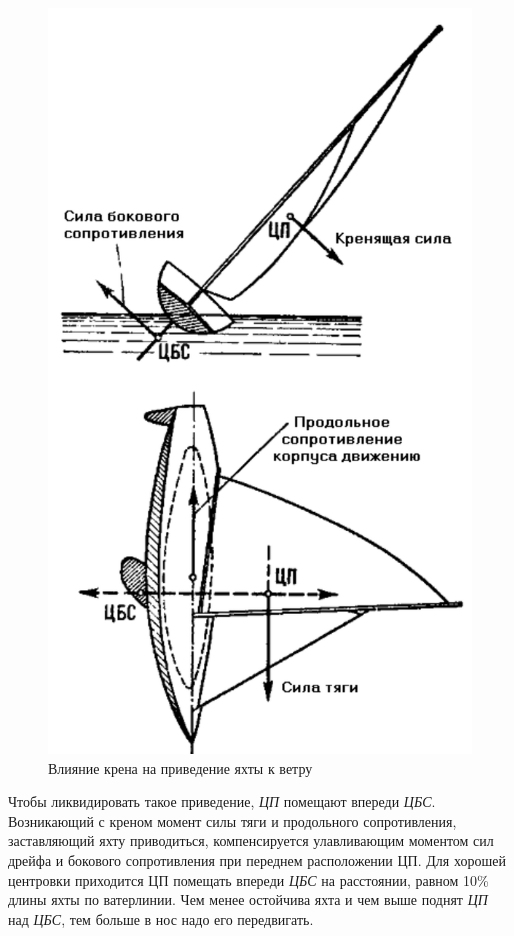 \documentclass[a4paper, 12pt, twoside, final]{scrbook}
\begin{document}
\begin{figure}[htbp]
   \centering
   \includegraphics{100_Vlijanie_krena} %
   \caption{Влияние крена на приведение яхты к ветру}
   \label{fig:100}
\end{figure}

Чтобы ликвидировать такое приведение, \textit{ЦП} помещают впереди \textit{ЦБС}. Возникающий с креном момент силы тяги и продольного сопротивления, заставляющий яхту приводиться, компенсируется улавливающим моментом сил дрейфа и бокового сопротивления при переднем расположении ЦП. Для хорошей центровки приходится ЦП помещать впереди \textit{ЦБС} на расстоянии, равном 10\% длины яхты по ватерлинии. Чем менее остойчива яхта и чем выше поднят \textit{ЦП} над \textit{ЦБС}, тем больше в нос надо его передвигать.
\end{document}
